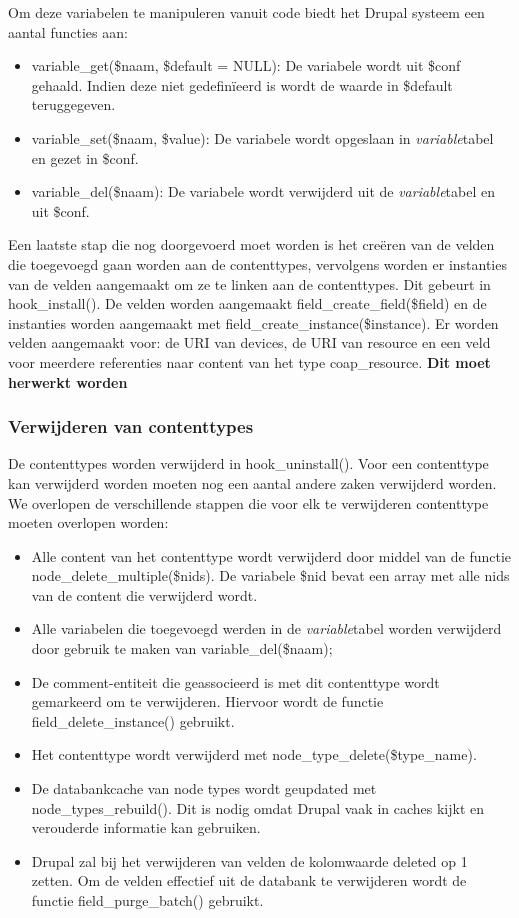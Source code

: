 \noindent
Om deze variabelen te manipuleren vanuit code biedt het Drupal systeem een aantal functies aan:
\begin{itemize}
\item variable\_get(\$naam, \$default = NULL): De variabele wordt uit \$conf gehaald. Indien deze niet gedefin\"{i}eerd is wordt de waarde in \$default teruggegeven.
\item variable\_set(\$naam, \$value): De variabele wordt opgeslaan in \textit{variable}tabel en gezet in \$conf.
\item variable\_del(\$naam): De variabele wordt verwijderd uit de \textit{variable}tabel en uit \$conf.
\end{itemize}

\noindent
Een laatste stap die nog doorgevoerd moet worden is het cre\"{e}ren van de velden die toegevoegd gaan worden aan de contenttypes, vervolgens worden er instanties van de velden aangemaakt om ze te linken aan de contenttypes. Dit gebeurt in hook\_install(). De velden worden aangemaakt field\_create\_field(\$field) en de instanties worden aangemaakt met field\_create\_instance(\$instance). Er worden velden aangemaakt voor: de URI van devices, de URI van resource en een veld voor meerdere referenties naar content van het type coap\_resource. \textbf{Dit moet herwerkt worden}

\subsubsection{Verwijderen van contenttypes}
De contenttypes worden verwijderd in hook\_uninstall(). Voor een contenttype kan verwijderd worden moeten nog een aantal andere zaken verwijderd worden. We overlopen de verschillende stappen die voor elk te verwijderen contenttype moeten overlopen worden:
\begin{itemize}
\item Alle content van het contenttype wordt verwijderd door middel van de functie\\ node\_delete\_multiple(\$nids). De variabele \$nid bevat een array met alle nids van de content die verwijderd wordt.
\item Alle variabelen die toegevoegd werden in de \textit{variable}tabel worden verwijderd door gebruik te maken van variable\_del(\$naam);
\item De comment-entiteit die geassocieerd is met dit contenttype wordt gemarkeerd om te verwijderen. Hiervoor wordt de functie field\_delete\_instance() gebruikt.
\item Het contenttype wordt verwijderd met node\_type\_delete(\$type\_name).
\item De databankcache van node types wordt geupdated met node\_types\_rebuild(). Dit is nodig omdat Drupal vaak in caches kijkt en verouderde informatie kan gebruiken.
\item Drupal zal bij het verwijderen van velden de kolomwaarde deleted op 1 zetten. Om de velden effectief uit de databank te verwijderen wordt de functie field\_purge\_batch() gebruikt.
\end{itemize}

